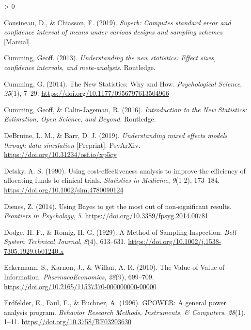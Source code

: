 \documentclass[
  english,
  ,jou, a4paper,floatsintext]{apa6}
\newlength{\cslhangindent}
\newenvironment{CSLReferences}[2] %
 {%
  \setlength{\parindent}{0pt}
  \ifodd #1 \everypar{\setlength{\hangindent}{\cslhangindent}}\ignorespaces\fi
  \ifnum #2 > 0
  \setlength{\parskip}{#2\baselineskip}
  \fi
 }%
 {}
\begin{document}
\begin{CSLReferences}{1}{0}
\leavevmode\hypertarget{ref-cousineau_superb_2019}{}%
Cousineau, D., \& Chiasson, F. (2019). \emph{Superb: Computes standard error and confidence interval of means under various designs and sampling schemes} {[}Manual{]}.

\leavevmode\hypertarget{ref-cumming_understanding_2013}{}%
Cumming, Geoff. (2013). \emph{Understanding the new statistics: Effect sizes, confidence intervals, and meta-analysis}. {Routledge}.

\leavevmode\hypertarget{ref-cumming_new_2014}{}%
Cumming, G. (2014). The {New Statistics}: Why and {How}. \emph{Psychological Science}, \emph{25}(1), 7--29. \url{https://doi.org/10.1177/0956797613504966}

\leavevmode\hypertarget{ref-cumming_introduction_2016}{}%
Cumming, Geoff, \& Calin-Jageman, R. (2016). \emph{Introduction to the {New Statistics}: Estimation, {Open Science}, and {Beyond}}. {Routledge}.

\leavevmode\hypertarget{ref-debruine_understanding_2019}{}%
DeBruine, L. M., \& Barr, D. J. (2019). \emph{Understanding mixed effects models through data simulation} {[}Preprint{]}. {PsyArXiv}. \url{https://doi.org/10.31234/osf.io/xp5cy}

\leavevmode\hypertarget{ref-detsky_using_1990}{}%
Detsky, A. S. (1990). Using cost-effectiveness analysis to improve the efficiency of allocating funds to clinical trials. \emph{Statistics in Medicine}, \emph{9}(1-2), 173--184. \url{https://doi.org/10.1002/sim.4780090124}

\leavevmode\hypertarget{ref-dienes_using_2014}{}%
Dienes, Z. (2014). Using {Bayes} to get the most out of non-significant results. \emph{Frontiers in Psychology}, \emph{5}. \url{https://doi.org/10.3389/fpsyg.2014.00781}

\leavevmode\hypertarget{ref-dodge_method_1929}{}%
Dodge, H. F., \& Romig, H. G. (1929). A {Method} of {Sampling Inspection}. \emph{Bell System Technical Journal}, \emph{8}(4), 613--631. \url{https://doi.org/10.1002/j.1538-7305.1929.tb01240.x}

\leavevmode\hypertarget{ref-eckermann_value_2010}{}%
Eckermann, S., Karnon, J., \& Willan, A. R. (2010). The {Value} of {Value} of {Information}. \emph{PharmacoEconomics}, \emph{28}(9), 699--709. \url{https://doi.org/10.2165/11537370-000000000-00000}

\leavevmode\hypertarget{ref-erdfelder_gpower_1996}{}%
Erdfelder, E., Faul, F., \& Buchner, A. (1996). {GPOWER}: A general power analysis program. \emph{Behavior Research Methods, Instruments, \& Computers}, \emph{28}(1), 1--11. \url{https://doi.org/10.3758/BF03203630}


\end{CSLReferences}
\end{document}
